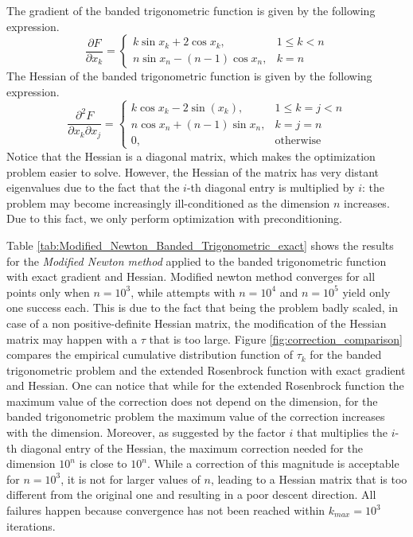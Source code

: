 The gradient of the banded trigonometric function is given by the following expression.
\begin{equation}
\frac{\partial F}{\partial x_k} = \left \{ \begin{array}{ll}
k\sin x_k + 2\cos x_k, & 1 \leq k < n \\
n\sin x_n - (n-1)\cos x_n, & k = n
\end{array} \right .
\end{equation}
The Hessian of the banded trigonometric function is given by the following expression.
\begin{equation}
\frac{\partial^2 F}{\partial x_k \partial x_j} = \left \{ \begin{array}{ll}
    k\cos x_k - 2\sin(x_k), & 1\leq k = j < n \\
    n\cos x_n + (n-1)\sin x_n, & k = j = n \\
    0, & \text{otherwise}
\end{array} \right .
\end{equation}
Notice that the Hessian is a diagonal matrix, which makes the optimization problem easier to solve.
However, the Hessian of the matrix has very distant eigenvalues due to the fact that the $i$-th diagonal entry is multiplied by $i$: the problem may become increasingly ill-conditioned as the dimension $n$ increases.
Due to this fact, we only perform optimization with preconditioning.

Table \ref{tab:Modified_Newton_Banded_Trigonometric_exact} shows the results for the \textit{Modified Newton method} applied to the banded trigonometric function with exact gradient and Hessian.
Modified newton method converges for all points only when $n=10^3$, while attempts with $n=10^4$ and $n=10^5$ yield only one success each.
This is due to the fact that being the problem badly scaled, in case of a non positive-definite Hessian matrix, the modification of the Hessian matrix may happen with a $\tau$ that is too large.
Figure \ref{fig:correction_comparison} compares the empirical cumulative distribution function of $\tau_k$ for the banded trigonometric problem and the extended Rosenbrock function with exact gradient and Hessian.
One can notice that while for the extended Rosenbrock function the maximum value of the correction does not depend on the dimension, for the banded trigonometric problem the maximum value of the correction increases with the dimension.
Moreover, as suggested by the factor $i$ that multiplies the $i$-th diagonal entry of the Hessian, the maximum correction needed for the dimension $10^n$ is close to $10^n$.
While a correction of this magnitude is acceptable for $n=10^3$, it is not for larger values of $n$, leading to a Hessian matrix that is too different from the original one and resulting in a poor descent direction.
All failures happen because convergence has not been reached within $k_{\textit{max}} = 10^3$ iterations.

